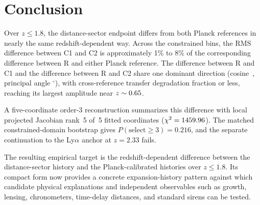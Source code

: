 \section{Conclusion}
\label{sec:conclusion}

Over $z\le1.8$, the distance-sector endpoint differs from both Planck references in nearly the same redshift-dependent way. Across the constrained bins, the RMS difference between C1 and C2 is approximately 1\% to 8\% of the corresponding difference between R and either Planck reference. The difference between R and C1 and the difference between R and C2 share one dominant direction (cosine~\GeometryCosineSimilarity{}, principal angle \GeometryPrincipalAngle$^{\circ}$), with cross-reference transfer degradation fraction \GeometryTransferDegradation{} or less, reaching its largest amplitude near $z\sim0.65{}$.

A five-coordinate order-3 reconstruction summarizes this difference with local projected Jacobian rank~5 of~5 fitted coordinates ($\chi^{2}=1459.96{}$). The matched constrained-domain bootstrap gives $P(\mathrm{select}\ge3)=0.216$, and the separate continuation to the Ly$\alpha$ anchor at $z=2.33$ fails.

The resulting empirical target is the redshift-dependent difference between the distance-sector history and the Planck-calibrated histories over $z\le1.8$. Its compact form now provides a concrete expansion-history pattern against which candidate physical explanations and independent observables such as growth, lensing, chronometers, time-delay distances, and standard sirens can be tested.

